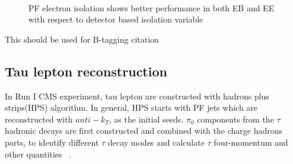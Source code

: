\begin{figure}[!htbp] 
     \centering
     \\
     \caption{PF electron isolation shows better performance in both EB and EE with respect to detector based isolation variable~\cite{electron_reco2015}}
     \label{fig:eleIso}
\end{figure}


This should be used for B-tagging citation~\cite{BTV-16-002}


\subsection{Tau lepton reconstruction} \label{Chapter:taureco}

In Run I CMS experiment, tau lepton are constructed with hadrons plus strips(HPS) algorithm. In general, HPS starts with PF jets which are reconstructed with $anti-k_{T}$, as the initial seeds. $\pi_{0}$ components from the $\tau$ hadronic decays are first constructed and combined with the charge hadrons parts, to identify different $\tau$ decay modes and calculate $\tau$ four-momentum and other quantities ~\cite{TauIdentiRunI}. 

